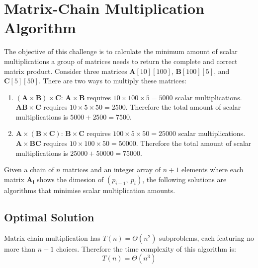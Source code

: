 \chapter{Matrix-Chain Multiplication Algorithm}
The objective of this challenge is to calculate the minimum amount of scalar
multiplications a group of matrices needs to return the complete and correct
matrix product. Consider three matrices $\mathbf{A}[10][100]$, $\mathbf{B}[100]
[5]$, and $\mathbf{C}[5][50]$. There are two ways to multiply these matrices:
\begin{enumerate}
\item $(\mathbf{A}\times\mathbf{B})\times\mathbf{C}$: $\mathbf{A}\times
    \mathbf{B}$ requires $10\times100\times5=5000$ scalar multiplications.
    $\mathbf{AB}\times\mathbf{C}$ requires $10\times5\times50=2500$. Therefore
    the total amount of scalar multiplications is $5000+2500=7500$.
\item $\mathbf{A}\times(\mathbf{B}\times\mathbf{C})$: $\mathbf{B}\times
    \mathbf{C}$ requires $100\times5\times50=25000$ scalar multiplications.
    $\mathbf{A}\times\mathbf{BC}$ requires $10\times100\times50=50000$.
    Therefore the total amount of scalar multiplications is $25000+50000=75000$.
\end{enumerate}

Given a chain of $n$ matrices and an integer array of $n+1$ elements where each
matrix $\mathbf{A_i}$ shows the dimesion of $\left(p_{i-1},~p_i\right)$, the
following solutions are algorithms that minimise scalar multiplication amounts.

\section{Optimal Solution}

Matrix chain multiplication has $T(n)=\Theta\left(n^2\right)$ subproblems, each
featuring no more than $n-1$ choices. Therefore the time complexity of this
algorithm is: \[ T(n)=\Theta\left(n^3\right) \]
